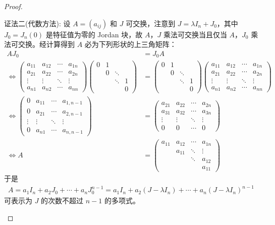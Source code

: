 \documentclass[../../main.tex]{subfiles}
\begin{document}
\begin{proof}
\begin{enumerate}[(1)]
{\color{blue}证法二(代数方法):}
设 $A=(a_{ij})$ 和 $J$ 可交换，注意到 $J = \lambda I_n + J_0$，其中 $J_0 = J_n(0)$ 是特征值为零的 Jordan 块，故 $A$，$J$ 乘法可交换当且仅当 $A$，$J_0$ 乘法可交换。经计算得到 $A$ 必为下列形状的上三角矩阵：
\begin{align*}
AJ_0 &= J_0A \\
\Longleftrightarrow \begin{pmatrix}
a_{11} & a_{12} & \cdots & a_{1n} \\
a_{21} & a_{22} & \cdots & a_{2n} \\
\vdots & \vdots & \ddots & \vdots \\
a_{n1} & a_{n2} & \cdots & a_{nn}
\end{pmatrix} \begin{pmatrix}
0 & 1 & & \\
& 0 & \ddots & \\
& & \ddots & 1 \\
& & & 0
\end{pmatrix} &= \begin{pmatrix}
0 & 1 & & \\
& 0 & \ddots & \\
& & \ddots & 1 \\
& & & 0
\end{pmatrix} \begin{pmatrix}
a_{11} & a_{12} & \cdots & a_{1n} \\
a_{21} & a_{22} & \cdots & a_{2n} \\
\vdots & \vdots & \ddots & \vdots \\
a_{n1} & a_{n2} & \cdots & a_{nn}
\end{pmatrix} \\
\Longleftrightarrow \begin{pmatrix}
0 & a_{11} & \cdots & a_{1,n-1} \\
0 & a_{21} & \cdots & a_{2,n-1} \\
\vdots & \vdots & \ddots & \vdots \\
0 & a_{n1} & \cdots & a_{n,n-1}
\end{pmatrix} &= \begin{pmatrix}
a_{21} & a_{22} & \cdots & a_{2n} \\
a_{31} & a_{32} & \cdots & a_{3n} \\
\vdots & \vdots & \ddots & \vdots \\
0 & 0 & \cdots & 0
\end{pmatrix} \\
\Longleftrightarrow A &= \begin{pmatrix}
a_{11} & a_{12} & \cdots & a_{1n} \\
& a_{11} & \ddots & \vdots \\
& & \ddots & a_{12} \\
& & & a_{11}
\end{pmatrix}
\end{align*}
于是
\begin{align*}
A = a_1I_n + a_2J_0 + \cdots + a_nJ_0^{n - 1} = a_1I_n + a_2(J - \lambda I_n) + \cdots + a_n(J - \lambda I_n)^{n - 1}
\end{align*}
可表示为 $J$ 的次数不超过 $n - 1$ 的多项式。 


\end{enumerate}
\end{proof}
\end{document}
